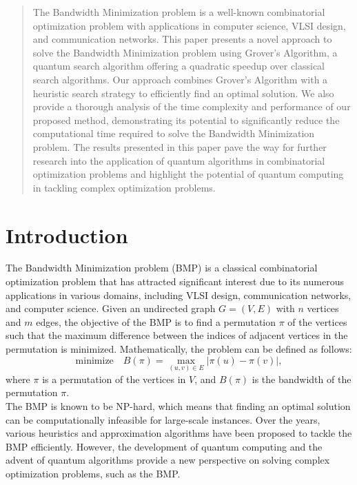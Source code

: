 \begin{abstract}
The Bandwidth Minimization problem is a well-known combinatorial optimization problem with applications in computer science, VLSI design, and communication networks. This paper presents a novel approach to solve the Bandwidth Minimization problem using Grover's Algorithm, a quantum search algorithm offering a quadratic speedup over classical search algorithms. Our approach combines Grover's Algorithm with a heuristic search strategy to efficiently find an optimal solution. We also provide a thorough analysis of the time complexity and performance of our proposed method, demonstrating its potential to significantly reduce the computational time required to solve the Bandwidth Minimization problem. The results presented in this paper pave the way for further research into the application of quantum algorithms in combinatorial optimization problems and highlight the potential of quantum computing in tackling complex optimization problems.

\end{abstract}

\section{Introduction}

The Bandwidth Minimization problem (BMP) is a classical combinatorial optimization problem that has attracted significant interest due to its numerous applications in various domains, including VLSI design, communication networks, and computer science. Given an undirected graph $G = (V, E)$ with $n$ vertices and $m$ edges, the objective of the BMP is to find a permutation $\pi$ of the vertices such that the maximum difference between the indices of adjacent vertices in the permutation is minimized. Mathematically, the problem can be defined as follows: \\

\begin{equation}
\text{minimize} \quad B(\pi) = \max_{(u, v) \in E} |\pi(u) - \pi(v)|,
\end{equation}
where $\pi$ is a permutation of the vertices in $V$, and $B(\pi)$ is the bandwidth of the permutation $\pi$. \\

The BMP is known to be NP-hard, which means that finding an optimal solution can be computationally infeasible for large-scale instances. Over the years, various heuristics and approximation algorithms have been proposed to tackle the BMP efficiently. However, the development of quantum computing and the advent of quantum algorithms provide a new perspective on solving complex optimization problems, such as the BMP. \\

